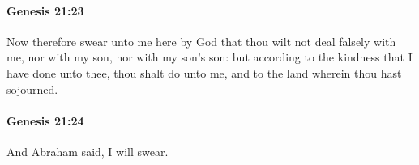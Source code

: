 		\paragraph{Genesis 21:23} %
			\label{GENESIS-21-23}

			Now therefore swear unto me here by God that thou wilt not deal falsely with me, nor with my son, nor with my son's son: but according to the kindness that I have done unto thee, thou shalt do unto me, and to the land wherein thou hast sojourned.


		\paragraph{Genesis 21:24} %
			\label{GENESIS-21-24}

			And Abraham said, I will swear.



